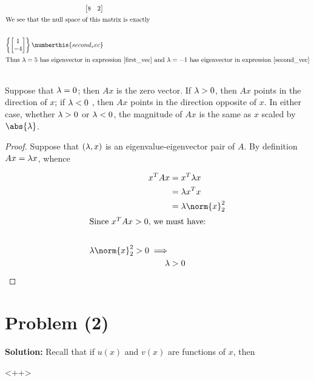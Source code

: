 \documentclass[../main.tex]{subfiles}
\begin{document}
\begin{align*}
\begin{bmatrix}
        8 & 2 \\
    \end{bmatrix} \\
    \intertext{We see that the null space of this matrix is exactly} \\
    \left\{ \begin{bmatrix}
        1 \\
        -4 \\
    \end{bmatrix} \right\} \numberthis{second_vec} \\
    \intertext{Thus $\l = 5$ has eigenvector in expression \eqref{first_vec} and $\l = -1$ has eigenvector in expression \eqref{second_vec}} \\
\end{align*}


Suppose that $\lambda = 0$; then $Ax$ is the zero vector. If $\lambda > 0$, then $Ax$ points in the direction of $x$; if $\lambda < 0$ , then $Ax$ points in the direction opposite of $x$. In either case, whether $\lambda > 0$ or $\lambda < 0$, the magnitude of $Ax$ is the same as $x$ scaled by $\abs{\l}$.


\begin{proof}
    Suppose that $(\lambda ,x)$ is an eigenvalue-eigenvector pair of $A$. By definition $Ax = \lambda x$, whence

    \begin{align*}
        x^TAx &= x^T\l x\\
        &= \l x^T x \\
        &= \l \norm{x}_{2}^{2} \\
        \intertext{Since $x^TAx > 0$, we must have:} \\
        \l \norm{x}_{2}^{2} > 0 \implies \\
        \l &> 0
    \end{align*}
\end{proof}

\section*{Problem (2)}
\textbf{Solution:}
Recall that if $u(x)$ and $v(x)$ are functions of $x$, then 

\[
    
\]<++>






\newpage \nocite{*}


\end{document}
